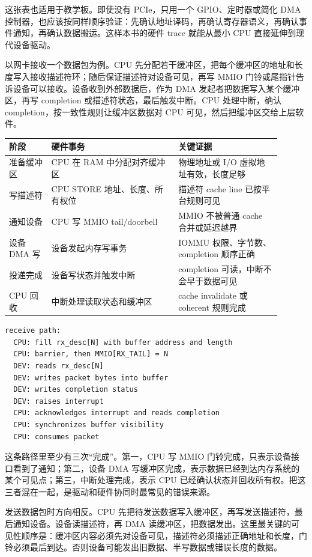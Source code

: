 这张表也适用于教学板。即使没有 PCIe，只用一个 GPIO、定时器或简化 DMA 控制器，也应该按同样顺序验证：先确认地址译码，再确认寄存器语义，再确认事件通知，再确认数据搬运。这样本书的硬件 trace 就能从最小 CPU 直接延伸到现代设备驱动。

以网卡接收一个数据包为例。CPU 先分配若干缓冲区，把每个缓冲区的地址和长度写入接收描述符环；随后保证描述符对设备可见，再写 MMIO 门铃或尾指针告诉设备可以接收。设备收到外部数据后，作为 DMA 发起者把数据写入某个缓冲区，再写 completion 或描述符状态，最后触发中断。CPU 处理中断，确认 completion，按一致性规则让缓冲区数据对 CPU 可见，然后把缓冲区交给上层软件。

\begin{longtable}{L{0.14\linewidth}L{0.42\linewidth}L{0.34\linewidth}}
\toprule
阶段 & 硬件事务 & 关键证据 \\
\midrule
准备缓冲区 & CPU 在 RAM 中分配对齐缓冲区 & 物理地址或 I/O 虚拟地址有效，长度足够 \\
写描述符 & CPU STORE 地址、长度、所有权位 & 描述符 cache line 已按平台规则可见 \\
通知设备 & CPU 写 MMIO tail/doorbell & MMIO 不被普通 cache 合并或延迟越界 \\
设备 DMA 写 & 设备发起内存写事务 & IOMMU 权限、字节数、completion 顺序正确 \\
投递完成 & 设备写状态并触发中断 & completion 可读，中断不会早于数据可见 \\
CPU 回收 & 中断处理读取状态和缓冲区 & cache invalidate 或 coherent 规则完成 \\
\bottomrule
\end{longtable}

\begin{lstlisting}
receive path:
  CPU: fill rx_desc[N] with buffer address and length
  CPU: barrier, then MMIO[RX_TAIL] = N
  DEV: reads rx_desc[N]
  DEV: writes packet bytes into buffer
  DEV: writes completion status
  DEV: raises interrupt
  CPU: acknowledges interrupt and reads completion
  CPU: synchronizes buffer visibility
  CPU: consumes packet
\end{lstlisting}

这条路径里至少有三次“完成”。第一，CPU 写 MMIO 门铃完成，只表示设备接口看到了通知；第二，设备 DMA 写缓冲区完成，表示数据已经到达内存系统的某个可见点；第三，中断处理完成，表示 CPU 已经确认状态并回收所有权。把这三者混在一起，是驱动和硬件协同时最常见的错误来源。

发送数据包时方向相反。CPU 先把待发送数据写入缓冲区，再写发送描述符，最后通知设备。设备读描述符，再 DMA 读缓冲区，把数据发出。这里最关键的可见性顺序是：缓冲区内容必须先对设备可见，描述符必须描述正确地址和长度，门铃必须最后到达。否则设备可能发出旧数据、半写数据或错误长度的数据。

